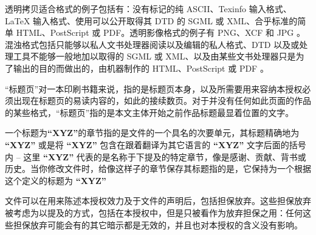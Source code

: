 透明拷贝适合格式的例子包括有：没有标记的纯 ASCII、Texinfo 输入格式、LaTeX 输入格式、使用可以公开取得其 DTD 的 SGML 或 XML、合乎标准的简单 HTML、PostScript 或 PDF。透明影像格式的例子有 PNG、XCF 和 JPG 。混浊格式包括只能够以私人文书处理器阅读以及编辑的私人格式、DTD 以及或处理工具不能够一般地加以取得的 SGML 或 XML、以及由某些文书处理器只是为了输出的目的而做出的，由机器制作的 HTML、PostScript 或 PDF 。


``标题页''对一本印刷书籍来说，指的是标题页本身，以及所需要用来容纳本授权必须出现在标题页的易读内容的，如此的接续数页。对于并没有任何如此页面的作品的某些格式，``标题页''指的是本文主体开始之前作品标题最显着位置的文字。


一个标题为\textbf{``XYZ''}的章节指的是文件的一个具名的次要单元，其标题精确地为 \textbf{``XYZ''} 或是将 \textbf{``XYZ''} 包含在跟着翻译为其它语言的 \textbf{``XYZ''} 文字后面的括号内 -- 这里 \textbf{``XYZ''} 代表的是名称于下提及的特定章节，像是感谢、贡献、背书或历史。当你修改文件时，给像这样子的章节保存其标题指的是，它保持为一个根据这个定义的标题为 \textbf{``XYZ''}


文件可以在用来陈述本授权效力及于文件的声明后，包括担保放弃。这些担保放弃被考虑为以提及的方式，包括在本授权中，但是只被看作为放弃担保之用：任何这些担保放弃可能会有的其它暗示都是无效的，并且也对本授权的含义没有影响。

